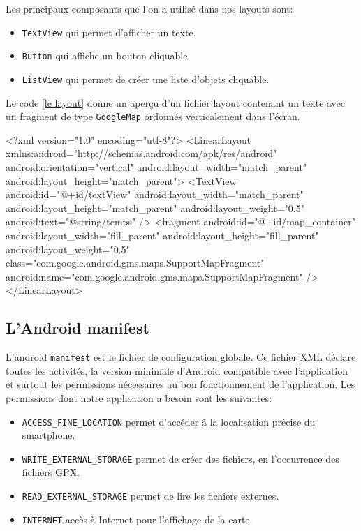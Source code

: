 Les principaux composants que l'on a utilisé dans nos layouts sont:\bigskip

\begin{itemize}
 	\item \verb!TextView! qui permet d'afficher un texte.
 	\item \verb!Button! qui affiche un bouton cliquable.
 	\item \verb!ListView! qui permet de créer une liste d'objets cliquable.
\end{itemize}\bigskip
 
Le code \ref{le layout} donne un aperçu d'un fichier layout contenant un texte avec un fragment de type \verb!GoogleMap! ordonnés verticalement dans l'écran.
\begin{xml}
<?xml version="1.0" encoding="utf-8"?>
<LinearLayout xmlns:android="http://schemas.android.com/apk/res/android"
    android:orientation="vertical" android:layout_width="match_parent"
    android:layout_height="match_parent">	
	<TextView
		android:id="@+id/textView"
    	android:layout_width="match_parent"
        android:layout_height="match_parent"        
        android:layout_weight="0.5"
        android:text="@string/temps" />
    <fragment
        android:id="@+id/map_container"
        android:layout_width="fill_parent"
        android:layout_height="fill_parent"
        android:layout_weight="0.5"
        class="com.google.android.gms.maps.SupportMapFragment"
        android:name="com.google.android.gms.maps.SupportMapFragment" />
</LinearLayout>
\end{xml}
\label{le layout}
\subsection{L'Android manifest}
\label{manifest}
L'android \verb!manifest! est le fichier de configuration globale. Ce fichier XML déclare toutes les activités, la version minimale d'Android compatible avec l'application et surtout les permissions nécessaires au bon fonctionnement de l'application. Les permissions dont notre application a besoin sont les suivantes:\bigskip

\begin{itemize}
 	\item \verb!ACCESS_FINE_LOCATION! permet d'accéder à la localisation précise du smartphone.
 	\item \verb!WRITE_EXTERNAL_STORAGE! permet de créer des fichiers, en l'occurrence des fichiers GPX.
 	\item \verb!READ_EXTERNAL_STORAGE! permet de lire les fichiers externes.
 	\item \verb!INTERNET! accès à Internet pour l'affichage de la carte.
\end{itemize}\bigskip

